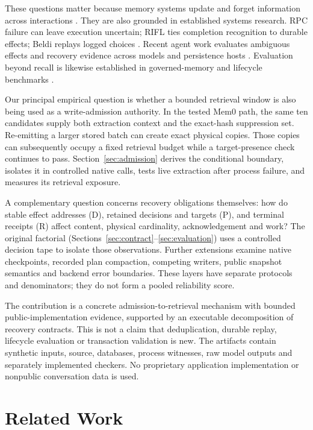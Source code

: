 \documentclass[10pt,letterpaper]{article}
\begin{document}
These questions matter because memory systems update and forget information across interactions \cite{packer2023memgpt,zhong2023memorybank,chhikara2025mem}. They are also grounded in established systems research. RPC failure can leave execution uncertain; RIFL ties completion recognition to durable effects; Beldi replays logged choices \cite{birrell1984implementing,lee2015implementing,zhang2020fault}. Recent agent work evaluates ambiguous effects and recovery evidence across models and persistence hosts \cite{li2026where,marla2026permission}. Evaluation beyond recall is likewise established in governed-memory and lifecycle benchmarks \cite{zhou2026timlmembench,bilgin2026capture,uddin2026memora}.

Our principal empirical question is whether a bounded retrieval window is also being used as a write-admission authority. In the tested Mem0 path, the same ten candidates supply both extraction context and the exact-hash suppression set. Re-emitting a larger stored batch can create exact physical copies. Those copies can subsequently occupy a fixed retrieval budget while a target-presence check continues to pass. Section~\ref{sec:admission} derives the conditional boundary, isolates it in controlled native calls, tests live extraction after process failure, and measures its retrieval exposure.

A complementary question concerns recovery obligations themselves: how do stable effect addresses (D), retained decisions and targets (P), and terminal receipts (R) affect content, physical cardinality, acknowledgement and work? The original factorial (Sections~\ref{sec:contract}--\ref{sec:evaluation}) uses a controlled decision tape to isolate those observations. Further extensions examine native checkpoints, recorded plan compaction, competing writers, public snapshot semantics and backend error boundaries. These layers have separate protocols and denominators; they do not form a pooled reliability score.

The contribution is a concrete admission-to-retrieval mechanism with bounded public-implementation evidence, supported by an executable decomposition of recovery contracts. This is not a claim that deduplication, durable replay, lifecycle evaluation or transaction validation is new. The artifacts contain synthetic inputs, source, databases, process witnesses, raw model outputs and separately implemented checkers. No proprietary application implementation or nonpublic conversation data is used.

\section{Related Work}
\label{sec:related-work}
\end{document}
